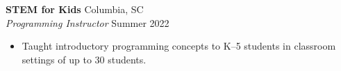 \textbf{STEM for Kids} \hfill Columbia, SC\\
\textit{Programming Instructor} \hfill Summer 2022
\begin{itemize}
  \item Taught introductory programming concepts to K--5 students in classroom settings of up to 30 students.
\end{itemize}

